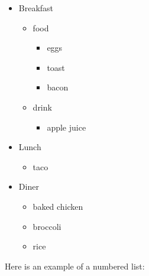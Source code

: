 \documentclass[]{article}
\providecommand{\tightlist}{%
  \setlength{\itemsep}{0pt}\setlength{\parskip}{0pt}}
\begin{document}
\begin{itemize}
\tightlist
\item
  Breakfast

  \begin{itemize}
  \tightlist
  \item
    food

    \begin{itemize}
    \tightlist
    \item
      eggs
    \item
      toast
    \item
      bacon
    \end{itemize}
  \item
    drink

    \begin{itemize}
    \tightlist
    \item
      apple juice
    \end{itemize}
  \end{itemize}
\item
  Lunch

  \begin{itemize}
  \tightlist
  \item
    taco
  \end{itemize}
\item
  Diner

  \begin{itemize}
  \tightlist
  \item
    baked chicken
  \item
    broccoli
  \item
    rice
  \end{itemize}
\end{itemize}

Here is an example of a numbered list:
\end{document}
